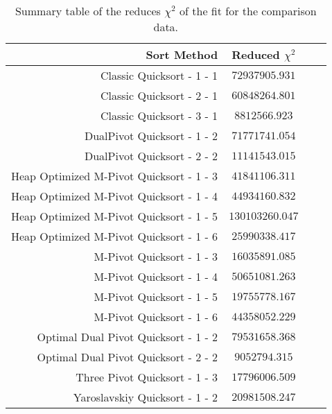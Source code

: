 	\begin{table}
		\begin{center}
			\begin{tabular}{|r|c|c|c}
				\hline
								Sort Method              &    Reduced $\chi^{2}$      \\ \hline \hline
				                Classic Quicksort - 1 - 1 &  $ 72937905.931$ \\ \hline
				                Classic Quicksort - 2 - 1 &  $ 60848264.801$ \\ \hline
				                Classic Quicksort - 3 - 1 &  $ 8812566.923$ \\ \hline
				              DualPivot Quicksort - 1 - 2 &  $ 71771741.054$ \\ \hline
				              DualPivot Quicksort - 2 - 2 &  $ 11141543.015$ \\ \hline
				 Heap Optimized M-Pivot Quicksort - 1 - 3 &  $ 41841106.311$ \\ \hline
				 Heap Optimized M-Pivot Quicksort - 1 - 4 &  $ 44934160.832$ \\ \hline
				 Heap Optimized M-Pivot Quicksort - 1 - 5 &  $ 130103260.047$ \\ \hline
				 Heap Optimized M-Pivot Quicksort - 1 - 6 &  $ 25990338.417$ \\ \hline
				                M-Pivot Quicksort - 1 - 3 &  $ 16035891.085$ \\ \hline
				                M-Pivot Quicksort - 1 - 4 &  $ 50651081.263$ \\ \hline
				                M-Pivot Quicksort - 1 - 5 &  $ 19755778.167$ \\ \hline
				                M-Pivot Quicksort - 1 - 6 &  $ 44358052.229$ \\ \hline
				     Optimal Dual Pivot Quicksort - 1 - 2 &  $ 79531658.368$ \\ \hline
				     Optimal Dual Pivot Quicksort - 2 - 2 &  $ 9052794.315$ \\ \hline
				            Three Pivot Quicksort - 1 - 3 &  $ 17796006.509$ \\ \hline
				           Yaroslavskiy Quicksort - 1 - 2 &  $ 20981508.247$ \\ \hline
			\end{tabular}
			\caption{Summary table of the reduces $\chi^{2}$ of the fit for the comparison data.}
			\label{tab:compFitCoeffChiSq}
		\end{center}
	\end{table}













